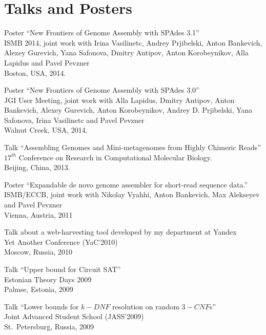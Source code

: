 \section{Talks and Posters}
\begin{innerlist}
 \item Poster ``New Frontiers of Genome Assembly with SPAdes 3.1''\\  
       ISMB 2014, joint work with Irina Vasilinetc, Andrey Prjibelski, Anton Bankevich, Alexey Gurevich, Yana Safonova, Dmitry Antipov, Anton Korobeynikov, Alla Lapidus and Pavel Pevzner\\
       Boston, USA, 2014. 
 \item Poster ``New Frontiers of Genome Assembly with SPAdes 3.0''\\
       JGI User Meeting, joint work with Alla Lapidus, Dmitry Antipov, Anton Bankevich, Alexey Gurevich, Anton Korobeynikov, Andrey D. Prjibelski, Yana Safonova, Irina Vasilinetc and Pavel Pevzner \\ 
       Walnut Creek, USA, 2014.
 \item Talk ``Assembling Genomes and Mini-metagenomes from Highly Chimeric Reads''
       $17^{th}$ Conference on Research in Computational Molecular Biology.\\ 
       Beijing, China, 2013.
 \item Poster ``Expandable de novo genome assembler for short-read sequence data.''\\
       ISMB/ECCB, joint work with Nikolay Vyahhi, Anton Bankevich, Max Alekseyev and Pavel Pevzner\\ 
       Vienna, Austria, 2011
 \item Talk about a web-harvesting tool developed by my department at Yandex\\
       Yet Another Conference (YaC'2010)\\
       Moscow, Russia, 2010
 \item Talk ``Upper bound for Circuit SAT''\\
       Estonian Theory Days 2009\\
       Palmse, Estonia, 2009
 \item Talk ``Lower bounds for $k-DNF$ resolution on random $3-CNF$s''\\
       Joint Advanced Student School (JASS'2009)\\
       St.~Petersburg, Russia, 2009
\end{innerlist}
